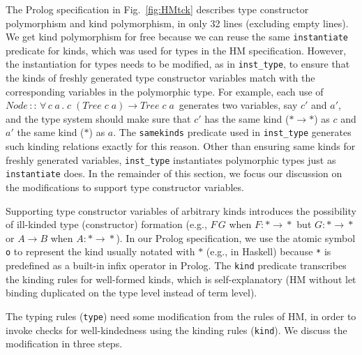 \documentclass[runningheads,a4paper]{llncs}
\begin{document}
The Prolog specification in Fig.~\ref{fig:HMtck} describes
type constructor polymorphism and kind polymorphism, in only 32 lines
(excluding empty lines). We get kind polymorphism for free because
we can reuse the same \verb|instantiate| predicate for kinds, which was
used for types in the HM specification. However, the instantiation for
types needs to be modified, as in \verb|inst_type|, to ensure that
the kinds of freshly generated type constructor variables match with
the corresponding variables in the polymorphic type. For example, each use of
$\textit{Node}\,::\,
 \forall\,c\;a\,.\;c\;(\textit{Tree}\;c\;a)\to\textit{Tree}\;c\;a\,$
generates two variables, say $c'$ and $a'$, and the type system should make sure
that $c'$ has the same kind ($*\to*$) as $c$ and $a'$ the same kind ($*$) as $a$.
The \verb|samekinds| predicate used in \verb|inst_type| generates such
kinding relations exactly for this reason. Other than ensuring same kinds for
freshly generated variables, \verb|inst_type| instantiates polymorphic types
just as \verb|instantiate| does. In the remainder of this section, we focus
our discussion on the modifications to support type constructor variables.

Supporting type constructor variables of
arbitrary kinds introduces the possibility of ill-kinded type (constructor)
formation (e.g., $F\,G$ when $F:*\!\to\!*$ but $G:*\!\to\!*$ \;or\; 
$A\!\to\!B$ when $A:*\!\to\!*$). In our Prolog specification, we use
the atomic symbol \verb|o| to represent the kind usually notated with $*$
(e.g., in Haskell) because \verb|*| is predefined as a built-in infix
operator in Prolog. The \verb|kind| predicate transcribes the kinding rules
for well-formed kinds, which is self-explanatory (HM without let binding
duplicated on the type level instead of term level).

The typing rules (\verb|type|) need some modification from the rules of HM,
in order to invoke checks for well-kindedness using the kinding rules
(\verb|kind|). We discuss the modification in three steps.
\end{document}
